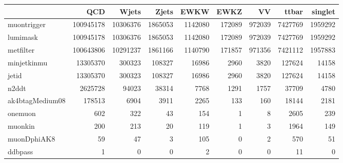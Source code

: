 \begin{tabular}{lrrrrrrrr}
\toprule
 & QCD & Wjets & Zjets & EWKW & EWKZ & VV & ttbar & singlet \\
\midrule
muontrigger & 100945178 & 10306376 & 1865053 & 1142080 & 172089 & 972039 & 7427769 & 1959292 \\
lumimask & 100945178 & 10306376 & 1865053 & 1142080 & 172089 & 972039 & 7427769 & 1959292 \\
metfilter & 100643806 & 10291237 & 1861166 & 1140790 & 171857 & 971356 & 7421112 & 1957883 \\
minjetkinmu & 13305370 & 300323 & 108327 & 16986 & 2960 & 3820 & 127624 & 14158 \\
jetid & 13305370 & 300323 & 108327 & 16986 & 2960 & 3820 & 127624 & 14158 \\
n2ddt & 2625728 & 94023 & 38314 & 7768 & 1291 & 1757 & 37709 & 4780 \\
ak4btagMedium08 & 178513 & 6904 & 3911 & 2265 & 133 & 160 & 18144 & 2181 \\
onemuon & 602 & 322 & 43 & 154 & 1 & 8 & 2605 & 239 \\
muonkin & 200 & 213 & 20 & 119 & 1 & 3 & 1964 & 149 \\
muonDphiAK8 & 59 & 47 & 3 & 105 & 0 & 2 & 570 & 51 \\
ddbpass & 1 & 0 & 0 & 2 & 0 & 0 & 11 & 0 \\
\bottomrule
\end{tabular}
